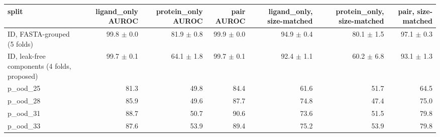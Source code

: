 \begin{tabular}{lrrrrrr}
\toprule
split & ligand\_only AUROC & protein\_only AUROC & pair AUROC & ligand\_only, size-matched & protein\_only, size-matched & pair, size-matched \\ \midrule
ID, FASTA-grouped (5 folds) & 99.8 $\pm$ 0.0 & 81.9 $\pm$ 0.8 & 99.9 $\pm$ 0.0 & 94.9 $\pm$ 0.4 & 80.1 $\pm$ 1.5 & 97.1 $\pm$ 0.3 \\
ID, leak-free components (4 folds, proposed) & 99.7 $\pm$ 0.1 & 64.1 $\pm$ 1.8 & 99.7 $\pm$ 0.1 & 92.4 $\pm$ 1.1 & 60.2 $\pm$ 6.8 & 93.1 $\pm$ 1.3 \\
p\_ood\_25 & 81.3 & 49.8 & 84.4 & 61.6 & 51.7 & 64.5 \\
p\_ood\_28 & 85.9 & 49.6 & 87.7 & 74.8 & 47.4 & 75.0 \\
p\_ood\_31 & 88.7 & 50.7 & 90.6 & 73.6 & 51.5 & 79.8 \\
p\_ood\_33 & 87.6 & 53.9 & 89.4 & 75.2 & 53.9 & 79.8 \\
\bottomrule
\end{tabular}
